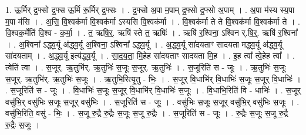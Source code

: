 \documentclass[17pt]{extarticle}
\begin{document}
1. ऊ॒र्मिर् द्र॒फ्सो द्र॒फ्स ऊ॒र्मि रू॒र्मिर् द्र॒फ्सः । . द्र॒फ्सो अ॒पा म॒पाम् द्र॒फ्सो द्र॒फ्सो अ॒पाम् । . अ॒पा म॑स्य स्य॒पा म॒पा म॑सि । . अ॒सि॒ वि॒श्वक॑र्मा वि॒श्वक॑र्मा ऽस्यसि वि॒श्वक॑र्मा । . वि॒श्वक॑र्मा ते ते वि॒श्वक॑र्मा वि॒श्वक॑र्मा ते । . वि॒श्वक॒र्मेति॑ वि॒श्व - क॒र्मा॒ । . त॒ ऋषि॒र्॒. ऋषि॑ स्ते त॒ ऋषिः॑ । . ऋषि॑ र॒श्विना॒ ऽश्विन र्.षि॒र्॒. ऋषि॑ र॒श्विना᳚ । . अ॒श्विना᳚ ऽद्ध्व॒र्यू अ॑द्ध्व॒र्यू अ॒श्विना॒ ऽश्विना᳚ ऽद्ध्व॒र्यू । . अ॒द्ध्व॒र्यू सा॑दयताꣳ सादयता मद्ध्व॒र्यू अ॑द्ध्व॒र्यू सा॑दयताम् । . अ॒द्ध्व॒र्यू इत्य॑द्ध्व॒र्यू । . सा॒द॒य॒ता॒ मि॒हेह सा॑दयताꣳ सादयता मि॒ह । . इ॒ह त्वा᳚ त्वे॒हेह त्वा᳚ । . त्वेति॑ त्वा । . स॒जूर्. ऋ॒तुभि॑र्. ऋ॒तुभिः॑ स॒जूः स॒जूर्. ऋ॒तुभिः॑ । . स॒जूरिति॑ स - जूः । . ऋ॒तुभिः॑ स॒जूः स॒जूर्. ऋ॒तुभि॑र्. ऋ॒तुभिः॑ स॒जूः । . ऋ॒तुभि॒रित्यृ॒तु - भिः॒ । . स॒जूर् वि॒धाभि॑र् वि॒धाभिः॑ स॒जूः स॒जूर् वि॒धाभिः॑ । . स॒जूरिति॑ स - जूः । . वि॒धाभिः॑ स॒जूः स॒जूर् वि॒धाभि॑र् वि॒धाभिः॑ स॒जूः । . वि॒धाभि॒रिति॑ वि - धाभिः॑ । . स॒जूर् वसु॑भि॒र् वसु॑भिः स॒जूः स॒जूर् वसु॑भिः । . स॒जूरिति॑ स - जूः । . वसु॑भिः स॒जूः स॒जूर् वसु॑भि॒र् वसु॑भिः स॒जूः । . वसु॑भि॒रिति॒ वसु॑ - भिः॒ । . स॒जू रु॒द्रै रु॒द्रैः स॒जूः स॒जू रु॒द्रैः । . स॒जूरिति॑ स - जूः । . रु॒द्रैः स॒जूः स॒जू रु॒द्रै रु॒द्रैः स॒जूः । \newline
\end{document}
